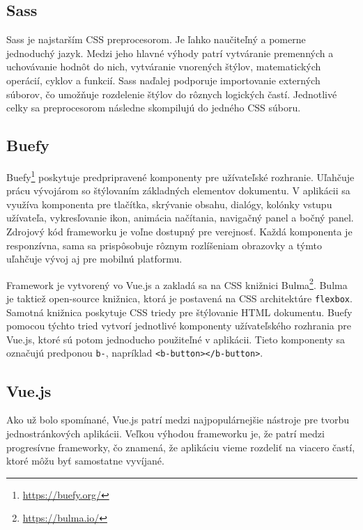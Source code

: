 \subsection*{Sass}
\label{sass}
Sass\cite{sass} je najstarším CSS preprocesorom. Je ľahko naučiteľný a pomerne jednoduchý jazyk. Medzi jeho hlavné výhody patrí vytváranie premenných a uchovávanie hodnôt do nich, vytváranie vnorených štýlov, matematických operácií, cyklov a funkcií. Sass naďalej podporuje importovanie externých súborov, čo umožňuje rozdelenie štýlov do rôznych logických častí. Jednotlivé celky sa preprocesorom následne skompilujú do jedného CSS súboru. 

\subsection*{Buefy}
\label{buefy}
Buefy\footnote{\url{https://buefy.org/}} poskytuje predpripravené komponenty pre užívateľské rozhranie. Uľahčuje prácu vývojárom so štýlovaním základných elementov dokumentu. V aplikácii sa využíva komponenta pre tlačítka, skrývanie obsahu, dialógy, kolónky vstupu užívateľa, vykresľovanie ikon, animácia načítania, navigačný panel a bočný panel. Zdrojový kód frameworku je voľne dostupný pre verejnosť. Každá komponenta je responzívna, sama sa prispôsobuje rôznym rozlíšeniam obrazovky a týmto uľahčuje vývoj aj pre mobilnú platformu. 

Framework je vytvorený vo Vue.js a zakladá sa na CSS knižnici Bulma\footnote{\url{https://bulma.io/}}. Bulma je taktiež open-source knižnica, ktorá je postavená na CSS architektúre \texttt{flexbox}. Samotná knižnica poskytuje CSS triedy pre štýlovanie HTML dokumentu. Buefy pomocou týchto tried vytvorí jednotlivé komponenty užívateľského rozhrania pre Vue.js, ktoré sú potom jednoducho použiteľné v aplikácii. Tieto komponenty sa označujú predponou \texttt{b-}, napríklad \texttt{<b-button></b-button>}.

\subsection{Vue.js}
\label{vue}
Ako už bolo spomínané, Vue.js\cite{vue-guide} patrí medzi najpopulárnejšie nástroje pre tvorbu jednostránkových aplikácii. Veľkou výhodou frameworku je, že patrí medzi progresívne frameworky, čo znamená, že aplikáciu vieme rozdeliť na viacero častí, ktoré môžu byť samostatne vyvíjané.

